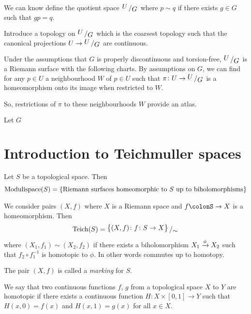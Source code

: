 \documentclass[11pt,a4paper]{article}
\begin{document}
We can know define the quotient space $\bigslant{U}{G}$ where
$p \sim q$ if there exists $g \in G$ such that $gp = q$.

Introduce a topology on $\bigslant{U}{G}$ which is the coarsest topology
such that the canonical projections $U \to \bigslant{U}{G}$ are continuous.

Under the assumptions that $G$ is properly discontinuous and torsion-free,
$\bigslant{U}{G}$ is a Riemann surface with the following charts.
By assumptions on $G$, we can find for any $p \in U$ a neighbourhood $W$ of
$p \in U$ such that $\pi \colon U \to \bigslant{U}{G}$ is a homeomorphism
onto its image when restricted to $W$.

So, restrictions of $\pi$ to these neighbourhoods $W$ provide an atlas.

\begin{definition}
  Let $G$
\end{definition}

\newpage

\section{Introduction to Teichmuller spaces}
Let $S$ be a topological space.
Then
\[
  \mathrm{Modulispace}(S) = 
  \set{\text{Riemann surfaces homeomorphic to $S$ up to biholomorphisms}}
\]
\begin{definition}
  We consider pairs $(X,f)$ where $X$ is a Riemann space and
  $f \colonS \to X$ is a homeomorphism.
  Then
  \[
    \mathrm{Teich}(S) = 
    \bigslant{\set{(X,f) \colon f \colon S \to X}}{\sim}
  \]
  where $(X_1,f_1) \sim (X_2,f_2)$ if there exists a biholomorphism 
  $X_1 \xrightarrow{\phi} X_2$ such that $f_2 \circ f_1^{-1}$ is homotopic to
  $\phi$.
  In other words
  commutes up to homotopy.
\end{definition}

\begin{remark}
  The pair $(X,f)$ is called a \emph{marking} for $S$.
\end{remark}

\begin{definition}[Homotopy]
  We say that two continuous functions $f$, $g$ from a topological space $X$
  to $Y$ are homotopic if there exists a continuous function 
  $H \colon X \times [0,1] \to Y$ such that $H(x,0) = f(x)$ and
  $H(x,1) = g(x)$ for all $x \in X$.
\end{definition}
\end{document}
